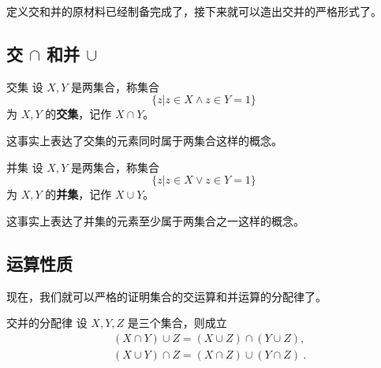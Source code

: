 定义交和并的原材料已经制备完成了，接下来就可以造出交并的严格形式了。
\subsection{交 $\cap$ 和并 $\cup$}
\begin{definition}{交集}
设 $X,Y$ 是两集合，称集合
\begin{equation}
\{z|z\in X\land z\in Y=1 \}~
\end{equation}
为 $X,Y$ 的\textbf{交集}，记作 $X\cap Y$。
\end{definition}
这事实上表达了交集的元素同时属于两集合这样的概念。
\begin{definition}{并集}
设 $X,Y$ 是两集合，称集合
\begin{equation}
\{z|z\in X\lor z\in Y=1 \}~
\end{equation}
为 $X,Y$ 的\textbf{并集}，记作 $X\cup Y$。
\end{definition}
这事实上表达了并集的元素至少属于两集合之一这样的概念。
\subsection{运算性质}
现在，我们就可以严格的证明集合的交运算和并运算的分配律了。
\begin{theorem}{交并的分配律}
设 $X,Y,Z$ 是三个集合，则成立
\begin{equation}
\begin{aligned}
&(X\cap Y)\cup Z=(X\cup Z)\cap (Y\cup Z),\\
&(X\cup Y)\cap Z=(X\cap Z)\cup (Y\cap Z)~.
\end{aligned}
\end{equation}

\end{theorem}

